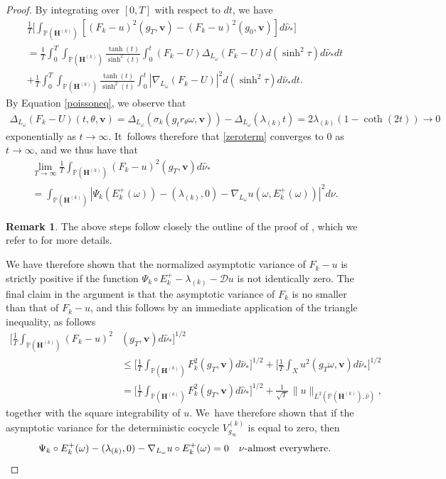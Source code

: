 \documentclass[JEP,XML,SOM,Unicode,published]{cedram}
\theoremstyle{plain}
\theoremstyle{definition}
\newtheorem{rem}[thm]{Remark}
\numberwithin{equation}{subsection}
\newcommand\bP{\mathbb{P}}
\newcommand\cD{\mathcal{D}}
\let\gradient\nabla
\let\laplacian\Delta
\newcommand{\bfH}{\boldsymbol{H}}
\newcommand{\bfv}{\boldsymbol{v}}
\begin{document}
\begin{proof}
\pagebreak[2]
By integrating over $[0,T]$ with respect to $dt$, we have
\begin{multline}\label{zeroterm}
\frac{1}{T}\biggl[\int_{\bP(\bfH^{(k)})}[(F_k-u)^2(g_T, \bfv)-(F_k-u)^2(g_0, \bfv)]d\hat{\nu}_*\biggr] \\
= \frac{1}{T} \int_0^T \int_{\bP(\bfH^{(k)})} \frac{\tanh(t)}{\sinh^2(t)} \int_{0}^{t} (F_k-U)\laplacian_{L_\omega}(F_k-U) d(\sinh^2\tau)d\hat{\nu}_* dt \\
+ \frac{1}{T} \int_0^T \int_{\bP(\bfH^{(k)})} \frac{\tanh(t)}{\sinh^2(t)} \int_{0}^{t} |\gradient_{L_\omega}(F_k-U)|^2 d(\sinh^2\tau)d\hat{\nu}_* dt.
\end{multline}
By Equation \eqref{poissoneq}, we observe that
\begin{align*}
\laplacian_{L_\omega}(F_k-U)(t,\theta, \bfv)  = \laplacian_{L_\omega}(\sigma_k(g_t r_\theta\omega, \bfv)) -\laplacian_{L_\omega}(\lambda_{(k)} t)
 = 2\lambda_{(k)} (1- \coth(2t)) \to 0 
\end{align*}
exponentially as $t\to\infty$. It~follows therefore that \eqref{zeroterm} converges to 0 as $t\to \infty$, and we thus have that
\begin{multline*}
\lim_{T\to\infty}\frac{1}{T}\int_{\bP(\bfH^{(k)})}(F_k-u)^2(g_T, \bfv)d\hat{\nu}_*\\
=\int_{\bP(\bfH^{(k)})} |\Psi_k(E^+_k(\omega))- (\lambda_{(k)},0) -\gradient_{L_\omega} u(\omega,E^+_k(\omega))|^2 d\nu.
\end{multline*}
\begin{rem}
The above steps follow closely the outline of the proof of \cite[Th.\,1]{FMZ12}, which we refer to for more details.
\end{rem}

We have therefore shown that the normalized asymptotic variance of $F_k-u$ is strictly positive if the function $ \Psi_k \circ E^+_k - \lambda_{(k)} -\cD u$ is not identically zero. The final claim in the argument is that the asymptotic variance of $F_k$ is no smaller than that of $F_k-u$, and this follows by an immediate application of the triangle inequality, as follows
\begin{align*}
\biggl[\frac{1}{T}\int_{\bP(\bfH^{(k)})} (F_k-u)^2&(g_T, \bfv)d\hat\nu_* \biggr]^{1/2}\\
&\leq \biggl[\frac{1}{T}\int_{\bP(\bfH^{(k)})} F_k^2(g_T, \bfv)d\hat \nu_* \biggr]^{1/2}+ \biggl[\frac{1}{T}\int_{X} u^2(g_T\omega, \bfv)d\hat\nu_* \biggr]^{1/2} \\
&= \biggl[\frac{1}{T}\int_{\bP(\bfH^{(k)})} F_k^2(g_T, \bfv)d\hat \nu_* \biggr]^{1/2}+ \frac{1}{\sqrt{T}}\,\|u\|_{L^2(\bP(\bfH^{(k)}),\hat \nu)},
\end{align*}
together with the square integrability of $u$. We~have therefore shown that if the asymptotic variance for the deterministic cocycle $V^{(k)}_{g_\infty}$ is equal to
zero, then
\begin{equation}
\Psi_k \circ E^+_k(\omega) - (\lambda_{(k)},0) -\gradient_{L_\omega}u\circ E^+_k(\omega) =0 \quad \nu\text{-almost everywhere.} \label{zerovariancecond}\qedhere
\end{equation}
\end{proof}
\end{document}
